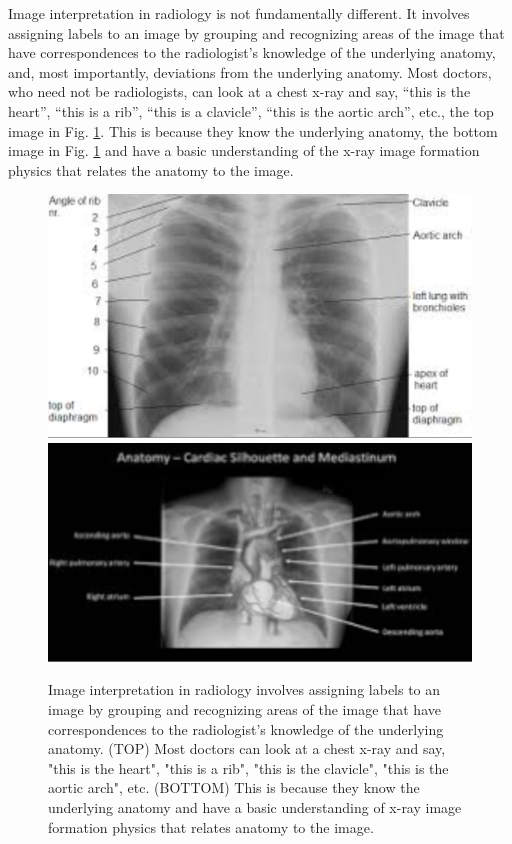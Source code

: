 \documentclass[
]{book}
\begin{document}
Image interpretation in radiology is not fundamentally different. It involves assigning labels to an image by grouping and recognizing areas of the image that have correspondences to the radiologist's knowledge of the underlying anatomy, and, most importantly, deviations from the underlying anatomy. Most doctors, who need not be radiologists, can look at a chest x-ray and say, ``this is the heart'', ``this is a rib'', ``this is a clavicle'', ``this is the aortic arch'', etc., the top image in Fig. \ref{fig:visual-search-chest-images}. This is because they know the underlying anatomy, the bottom image in Fig. \ref{fig:visual-search-chest-images} and have a basic understanding of the x-ray image formation physics that relates the anatomy to the image.

\begin{figure}

{\centering \includegraphics{images/15-visual-search/chest-imageA} \includegraphics{images/15-visual-search/chest-imageB} 

}

\caption{Image interpretation in radiology involves assigning labels to an image by grouping and recognizing areas of the image that have correspondences to the radiologist’s knowledge of the underlying anatomy. (TOP) Most doctors can look at a chest x-ray and say, "this is the heart", "this is a rib", "this is the clavicle", "this is the aortic arch", etc. (BOTTOM) This is because they know the underlying anatomy and have a basic understanding of x-ray image formation physics that relates anatomy to the image.}\label{fig:visual-search-chest-images}
\end{figure}
\end{document}
